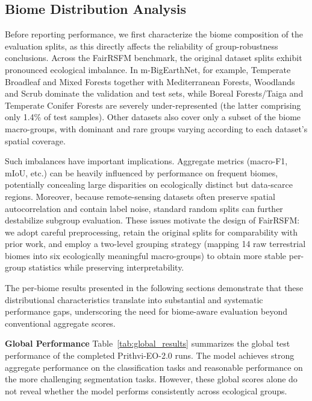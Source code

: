 \documentclass[10pt,twocolumn,letterpaper]{article}
\newcommand{\method}{FairRSFM\xspace}
\begin{document}
\subsection{Biome Distribution Analysis}

Before reporting performance, we first characterize the biome composition of the evaluation splits, as this directly affects the reliability of group-robustness conclusions. Across the \method benchmark, the original dataset splits exhibit pronounced ecological imbalance. In m-BigEarthNet, for example, Temperate Broadleaf and Mixed Forests together with Mediterranean Forests, Woodlands and Scrub dominate the validation and test sets, while Boreal Forests/Taiga and Temperate Conifer Forests are severely under-represented (the latter comprising only 1.4\% of test samples). Other datasets also cover only a subset of the biome macro-groups, with dominant and rare groups varying according to each dataset's spatial coverage.

Such imbalances have important implications. Aggregate metrics (macro-F1, mIoU, etc.) can be heavily influenced by performance on frequent biomes, potentially concealing large disparities on ecologically distinct but data-scarce regions. Moreover, because remote-sensing datasets often preserve spatial autocorrelation and contain label noise, standard random splits can further destabilize subgroup evaluation. These issues motivate the design of \method: we adopt careful preprocessing, retain the original splits for comparability with prior work, and employ a two-level grouping strategy (mapping 14 raw terrestrial biomes into six ecologically meaningful macro-groups) to obtain more stable per-group statistics while preserving interpretability.

The per-biome results presented in the following sections demonstrate that these distributional characteristics translate into substantial and systematic performance gaps, underscoring the need for biome-aware evaluation beyond conventional aggregate scores.

\noindent \textbf{Global Performance}
Table~\ref{tab:global_results} summarizes the global test performance of the completed Prithvi-EO-2.0 runs. The model achieves strong aggregate performance on the classification tasks and reasonable performance on the more challenging segmentation tasks. However, these global scores alone do not reveal whether the model performs consistently across ecological groups.
\end{document}
